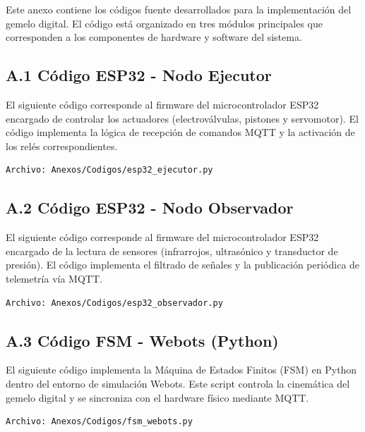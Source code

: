 

Este anexo contiene los códigos fuente desarrollados para la implementación del gemelo digital. El código está organizado en tres módulos principales que corresponden a los componentes de hardware y software del sistema.

\subsection*{A.1 Código ESP32 - Nodo Ejecutor}

El siguiente código corresponde al firmware del microcontrolador ESP32 encargado de controlar los actuadores (electroválvulas, pistones y servomotor). El código implementa la lógica de recepción de comandos MQTT y la activación de los relés correspondientes.

\begin{verbatim}
Archivo: Anexos/Codigos/esp32_ejecutor.py
\end{verbatim}

\subsection*{A.2 Código ESP32 - Nodo Observador}

El siguiente código corresponde al firmware del microcontrolador ESP32 encargado de la lectura de sensores (infrarrojos, ultrasónico y transductor de presión). El código implementa el filtrado de señales y la publicación periódica de telemetría vía MQTT.

\begin{verbatim}
Archivo: Anexos/Codigos/esp32_observador.py
\end{verbatim}

\subsection*{A.3 Código FSM - Webots (Python)}

El siguiente código implementa la Máquina de Estados Finitos (FSM) en Python dentro del entorno de simulación Webots. Este script controla la cinemática del gemelo digital y se sincroniza con el hardware físico mediante MQTT.

\begin{verbatim}
Archivo: Anexos/Codigos/fsm_webots.py
\end{verbatim}

